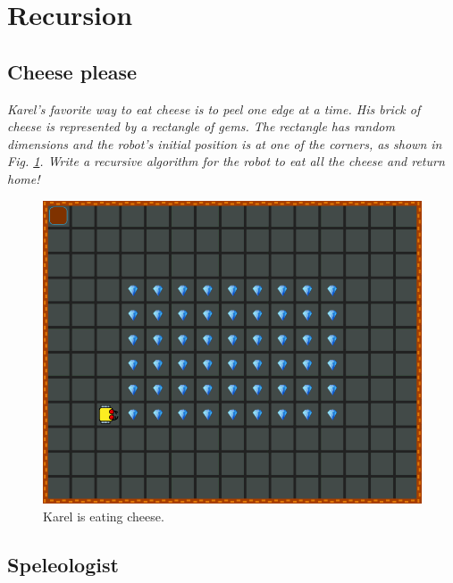 {{%

\section{Recursion}

\subsection{Cheese please}

{\em Karel's favorite way to eat cheese is to peel one edge at a time. His brick of 
cheese is represented by a rectangle of gems. The rectangle has random dimensions
and the robot's initial position is at one of the corners, as shown in Fig. \ref{fig:g01}.
Write a recursive algorithm for the robot to eat all the cheese and return home!
 }
\begin{figure}[!ht]
\begin{center}
\includegraphics[height=0.4\textwidth]{img/g01.png}
\end{center}
\vspace{-4mm}
\caption{Karel is eating cheese.}
\label{fig:g01}
\vspace{-1cm}
\end{figure}
\newpage


\subsection{Speleologist}

}}

